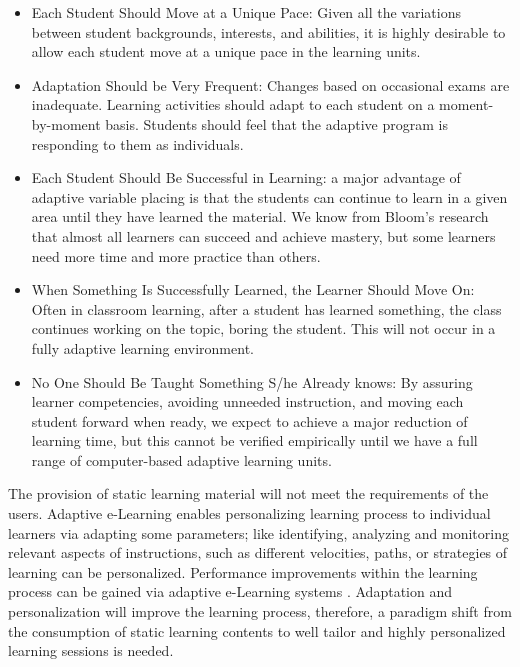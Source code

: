 \documentclass[12pt,a4paper,final,twoside,onecolumn,titlepage]{book}
\begin{document}
\begin{itemize}
\item Each Student Should Move at a Unique Pace: Given all the variations between student backgrounds, interests, and abilities, it is highly desirable to allow each student move at a unique pace in the learning units.
\item Adaptation Should be Very Frequent: Changes based on occasional exams are inadequate. Learning activities should adapt to each student on a moment-by-moment basis. Students should feel that the adaptive program is responding to them as individuals. 
\item Each Student Should Be Successful in Learning: a major advantage of adaptive variable placing is that the students can continue to learn in a given area until they have learned the material. We know from Bloom’s research that almost all learners can succeed and achieve mastery, but some learners need more time and more practice than others.
\item When Something Is Successfully Learned, the Learner Should Move On: Often in classroom learning, after a student has learned something, the class continues working on the topic, boring the student. This will not occur in a fully adaptive learning environment.
\item No One Should Be Taught Something S/he Already knows: By assuring learner competencies, avoiding unneeded instruction, and moving each student forward when ready, we expect to achieve a major reduction of learning time, but this cannot be verified empirically until we have a full range of computer-based adaptive learning units.
\end{itemize}
The provision of static learning material will not meet the requirements of the users. Adaptive 
e-Learning enables personalizing learning process to individual learners via adapting some parameters; like identifying, analyzing and monitoring relevant aspects of instructions, such as different velocities, paths, or strategies of learning can be personalized. Performance improvements within the learning process can be gained via adaptive e-Learning systems \cite{R15}. Adaptation and personalization will improve the learning process, therefore, a paradigm shift from the consumption of static learning contents to well tailor and highly personalized learning sessions is needed.
\end{document}
